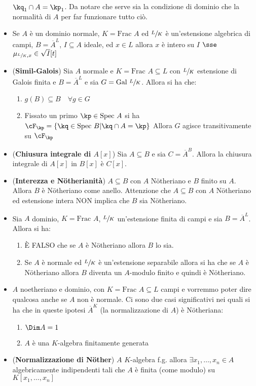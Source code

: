\documentclass[a4paper,NoNotes,GeneralMath]{stdmdoc}
\newcommand{\intclos}[2]{\ensuremath{\overline{#1}^{#2}}}
\newcommand{\Frac}{\text{Frac }}
\newcommand{\Spec}{\text{Spec }}
\newcommand{\Gal}{\text{Gal }}
\begin{document}
\begin{itemize}
  $\kq_1 \cap A = \kp_1$. \newline
  Da notare che serve sia la condizione di dominio che la normalità di
  $A$ per far funzionare tutto ciò.
\item Se $A$ è un dominio normale, $K = \Frac A$ ed $\sfrac{L}{K}$ è
  un'estensione algebrica di campi, $B = \intclos{A}{L}$,
  $I \subseteq A$ ideale, ed $x \in L$ allora $x$ è intero su $I$ $\sse$
  $\mu_{\sfrac{L}{K}, x} \in \sqrt{I}[t]$
\item ({\bf Simil-Galois}) Sia $A$ normale e $K = \Frac A \subseteq L$
  con $\sfrac{L}{K}$ estensione di Galois finita e $B = \intclos{A}{L}$
  e sia $G = \Gal \sfrac{L}{K}$. Allora si ha che:
  \begin{enumerate}
  \item $g(B) \subseteq B \quad \forall g \in G$
  \item Fissato un primo $\kp \in \Spec A$ si ha
    $\cF_\kp = \{ \kq \in \Spec B | \kq \cap A = \kp \}$
    Allora $G$ agisce transitivamente su $\cF_\kp$
  \end{enumerate}
\item ({\bf Chiusura integrale di $A[x]$}) Sia $A \subseteq B$ e sia
  $C = \intclos{A}{B}$. Allora la chiusura integrale di $A[x]$ in $B[x]$
  è $C[x]$.
\item ({\bf Interezza e Nötherianità}) $A \subseteq B$ con $A$
  Nötheriano e $B$ finito su $A$. Allora $B$ è Nötheriano come
  anello. \newline
  Attenzione che $A \subseteq B$ con $A$ Nötheriano ed estensione intera
  NON implica che $B$ sia Nötheriano.
\item Sia $A$ dominio, $K = \Frac A$, $\sfrac{L}{K}$ un'estensione
  finita di campi e sia $B = \intclos{A}{L}$. Allora si ha:
  \begin{enumerate}
  \item È FALSO che se $A$ è Nötheriano allora $B$ lo sia.
  \item Se $A$ è normale ed $\sfrac{L}{K}$ è un'estensione separabile
    allora si ha che se $A$ è Nötheriano allora $B$ diventa un
    $A$-modulo finito e quindi è Nötheriano.
  \end{enumerate}
\item $A$ noetheriano e dominio, con $K = \Frac A \subseteq L$ campi e
  vorremmo poter dire qualcosa anche se $A$ non è normale. Ci sono due
  casi significativi nei quali si ha che in queste ipotesi
  $\intclos{A}{K}$ (la normalizzazione di $A$) è Nötheriana:
  \begin{enumerate}
  \item $\Dim A = 1$
  \item $A$ è una $K$-algebra finitamente generata
  \end{enumerate}
\item ({\bf Normalizzazione di Nöther}) $A$ $K$-algebra f.g. allora
  $\exists x_1, \ldots, x_n \in A$ algebricamente indipendenti tali che
  $A$ è finita (come modulo) su $K[x_1, \ldots, x_n]$
  


\end{itemize}
\end{document}
